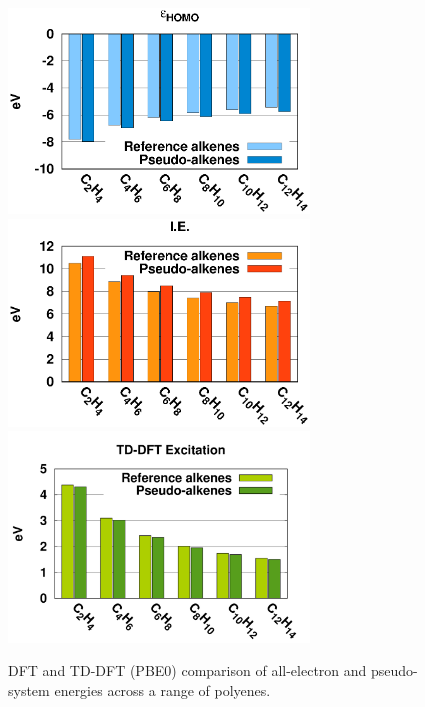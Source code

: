 \documentclass[12pt]{article}
\begin{document}
\begin{figure}
\begin{center}
\includegraphics[width=8cm]{short_pbe0_homo_uhf}
\includegraphics[width=8cm]{short_pbe0_ie_uhf}
\includegraphics[width=8cm]{short_pbe0_tddft}
\caption{DFT and TD-DFT (PBE0) comparison of all-electron and pseudo-system energies across a range of
polyenes.}
\label{fig:alkenes_hf_dft}
\end{center}
\vspace{0.25in}
\hspace*{3in}
\end{figure}
\end{document}
